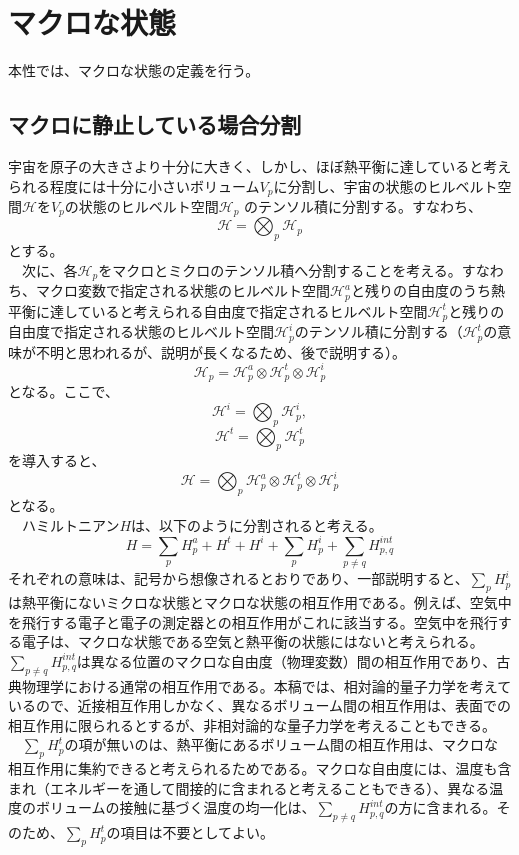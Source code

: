 \section{マクロな状態}
本性では、マクロな状態の定義を行う。
\subsection{マクロに静止している場合分割}
宇宙を原子の大きさより十分に大きく、しかし、ほぼ熱平衡に達していると考えられる程度には十分に小さいボリューム$V_p$に分割し、宇宙の状態のヒルベルト空間$\mathcal{H}$を$V_p$の状態のヒルベルト空間$\mathcal{H}_p$ のテンソル積に分割する。すなわち、
\begin{equation}
    \mathcal{H} = \bigotimes_p \mathcal{H}_p
\end{equation}
とする。\\
　次に、各$\mathcal{H}_p$をマクロとミクロのテンソル積へ分割することを考える。すなわち、マクロ変数で指定される状態のヒルベルト空間$\mathcal{H}_p^a$と残りの自由度のうち熱平衡に達していると考えられる自由度で指定されるヒルベルト空間$\mathcal{H}_p^t$と残りの自由度で指定される状態のヒルベルト空間$\mathcal{H}_p^i$のテンソル積に分割する（$\mathcal{H}_p^t$の意味が不明と思われるが、説明が長くなるため、後で説明する）。
\begin{equation}
    \mathcal{H}_p = \mathcal{H}_p^a \otimes \mathcal{H}_p^t \otimes \mathcal{H}_p^i
\end{equation}
となる。ここで、
\begin{equation}
    \mathcal{H}^i = \bigotimes_p \mathcal{H}_p^i,
\end{equation}
\begin{equation}
    \mathcal{H}^t = \bigotimes_p \mathcal{H}_p^t
\end{equation}
を導入すると、
\begin{equation}
    \mathcal{H} = \bigotimes_p \mathcal{H}_p^a \otimes  \mathcal{H}_p^t \otimes  \mathcal{H}_p^i
\end{equation}
となる。\\
　ハミルトニアン$H$は、以下のように分割されると考える。
\begin{equation}
H=\sum_pH_p^a + H^t + H^i + \sum_p H_p^i + \sum_{p \neq q} H^{int}_{p,q}
\end{equation}
それぞれの意味は、記号から想像されるとおりであり、一部説明すると、$\sum_p H_p^i$は熱平衡にないミクロな状態とマクロな状態の相互作用である。例えば、空気中を飛行する電子と電子の測定器との相互作用がこれに該当する。空気中を飛行する電子は、マクロな状態である空気と熱平衡の状態にはないと考えられる。$\sum_{p \neq q} H^{int}_{p,q}$は異なる位置のマクロな自由度（物理変数）間の相互作用であり、古典物理学における通常の相互作用である。本稿では、相対論的量子力学を考えているので、近接相互作用しかなく、異なるボリューム間の相互作用は、表面での相互作用に限られるとするが、非相対論的な量子力学を考えることもできる。\\
　$\sum_p H_p^t$の項が無いのは、熱平衡にあるボリューム間の相互作用は、マクロな相互作用に集約できると考えられるためである。マクロな自由度には、温度も含まれ（エネルギーを通して間接的に含まれると考えることもできる）、異なる温度のボリュームの接触に基づく温度の均一化は、$\sum_{p \neq q} H^{int}_{p,q}$の方に含まれる。そのため、$\sum_p H_p^t$の項目は不要としてよい。

